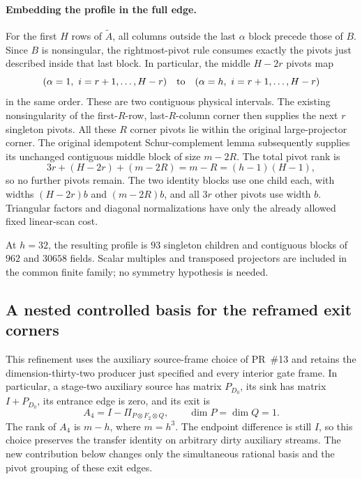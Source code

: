 \paragraph{Embedding the profile in the full edge.}
For the first \(H\) rows of \(\widetilde A\), all columns outside the
last \(\alpha\) block precede those of \(B\). Since \(B\) is nonsingular,
the rightmost-pivot rule consumes exactly the pivots just described inside
that last block. In particular, the middle \(H-2r\) pivots map
\[
 (\alpha=1,\ i=r+1,\ldots,H-r)
 \quad\hbox{to}\quad
 (\alpha=h,\ i=r+1,\ldots,H-r)
\]
in the same order. These are two contiguous physical intervals.
The existing nonsingularity of the first-\(R\)-row, last-\(R\)-column
corner then supplies the next \(r\) singleton pivots. All these
\(R\) corner pivots lie within the original large-projector corner.
The original idempotent Schur-complement lemma subsequently supplies
its unchanged contiguous middle block of size \(m-2R\).
The total pivot rank is
\[
 3r+(H-2r)+(m-2R)=m-R=(h-1)(H-1),
\]
so no further pivots remain. The two identity blocks use one child each,
with widths \((H-2r)b\) and \((m-2R)b\), and all \(3r\) other pivots
use width \(b\). Triangular factors and diagonal normalizations have
only the already allowed fixed linear-scan cost.

At $h=32$, the resulting profile is $93$ singleton children and
contiguous blocks of $962$ and $30658$ fields. Scalar multiples and
transposed projectors are included in the common finite family; no
symmetry hypothesis is needed.

\subsection{A nested controlled basis for the reframed exit corners}
\label{sec:nested-source-basis}

This refinement uses the auxiliary source-frame choice of PR~\#13 and
retains the dimension-thirty-two producer just specified and every interior
gate frame. In particular,
a stage-two auxiliary source has matrix $P_{D_0}$, its sink has matrix
$I+P_{D_0}$, its entrance edge is zero, and its exit is
\[
 A_4=I-\Pi_{P\otimes F_2\otimes Q},
 \qquad \dim P=\dim Q=1.
\]
The rank of $A_4$ is $m-h$, where $m=h^3$. The endpoint difference is
still $I$, so this choice preserves the transfer identity on arbitrary
dirty auxiliary streams. The new contribution below changes only the
simultaneous rational basis and the pivot grouping of these exit edges.

